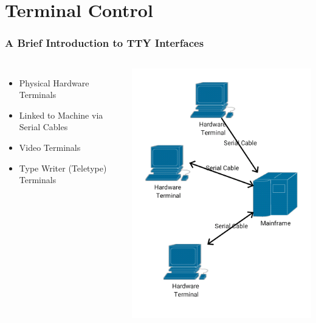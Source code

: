 \documentclass{beamer}
\begin{document}
\section{Terminal Control}
\begin{frame}
    \frametitle{A Brief Introduction to TTY Interfaces}
    \begin{columns}
       \begin{itemize}
           \item Physical Hardware Terminals
           \item Linked to Machine via Serial Cables
           \item Video Terminals
           \item Type Writer (Teletype) Terminals
       \end{itemize}
       
       \includegraphics[width=\textwidth]{images/ttyoldschool}
    \end{columns}
\end{frame}
\end{document}
